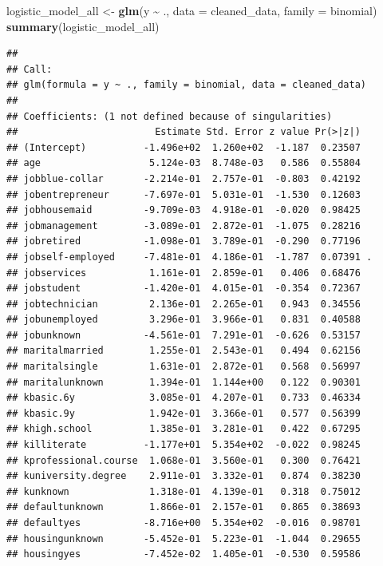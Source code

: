 \documentclass[
]{article}
\newenvironment{Shaded}{\begin{snugshade}}{\end{snugshade}}
\newcommand{\AttributeTok}[1]{\textcolor[rgb]{0.13,0.29,0.53}{#1}}
\newcommand{\FunctionTok}[1]{\textcolor[rgb]{0.13,0.29,0.53}{\textbf{#1}}}
\newcommand{\NormalTok}[1]{#1}
\newcommand{\OtherTok}[1]{\textcolor[rgb]{0.56,0.35,0.01}{#1}}
\newcommand{\SpecialCharTok}[1]{\textcolor[rgb]{0.81,0.36,0.00}{\textbf{#1}}}
\begin{document}
\begin{Shaded}
\begin{Highlighting}[]
\NormalTok{logistic\_model\_all }\OtherTok{\textless{}{-}} \FunctionTok{glm}\NormalTok{(y }\SpecialCharTok{\textasciitilde{}}\NormalTok{ ., }\AttributeTok{data =}\NormalTok{ cleaned\_data, }\AttributeTok{family =}\NormalTok{ binomial)}
\FunctionTok{summary}\NormalTok{(logistic\_model\_all)}
\end{Highlighting}
\end{Shaded}

\begin{verbatim}
## 
## Call:
## glm(formula = y ~ ., family = binomial, data = cleaned_data)
## 
## Coefficients: (1 not defined because of singularities)
##                        Estimate Std. Error z value Pr(>|z|)    
## (Intercept)          -1.496e+02  1.260e+02  -1.187  0.23507    
## age                   5.124e-03  8.748e-03   0.586  0.55804    
## jobblue-collar       -2.214e-01  2.757e-01  -0.803  0.42192    
## jobentrepreneur      -7.697e-01  5.031e-01  -1.530  0.12603    
## jobhousemaid         -9.709e-03  4.918e-01  -0.020  0.98425    
## jobmanagement        -3.089e-01  2.872e-01  -1.075  0.28216    
## jobretired           -1.098e-01  3.789e-01  -0.290  0.77196    
## jobself-employed     -7.481e-01  4.186e-01  -1.787  0.07391 .  
## jobservices           1.161e-01  2.859e-01   0.406  0.68476    
## jobstudent           -1.420e-01  4.015e-01  -0.354  0.72367    
## jobtechnician         2.136e-01  2.265e-01   0.943  0.34556    
## jobunemployed         3.296e-01  3.966e-01   0.831  0.40588    
## jobunknown           -4.561e-01  7.291e-01  -0.626  0.53157    
## maritalmarried        1.255e-01  2.543e-01   0.494  0.62156    
## maritalsingle         1.631e-01  2.872e-01   0.568  0.56997    
## maritalunknown        1.394e-01  1.144e+00   0.122  0.90301    
## kbasic.6y             3.085e-01  4.207e-01   0.733  0.46334    
## kbasic.9y             1.942e-01  3.366e-01   0.577  0.56399    
## khigh.school          1.385e-01  3.281e-01   0.422  0.67295    
## killiterate          -1.177e+01  5.354e+02  -0.022  0.98245    
## kprofessional.course  1.068e-01  3.560e-01   0.300  0.76421    
## kuniversity.degree    2.911e-01  3.332e-01   0.874  0.38230    
## kunknown              1.318e-01  4.139e-01   0.318  0.75012    
## defaultunknown        1.866e-01  2.157e-01   0.865  0.38693    
## defaultyes           -8.716e+00  5.354e+02  -0.016  0.98701    
## housingunknown       -5.452e-01  5.223e-01  -1.044  0.29655    
## housingyes           -7.452e-02  1.405e-01  -0.530  0.59586    

\end{verbatim}
\end{document}
